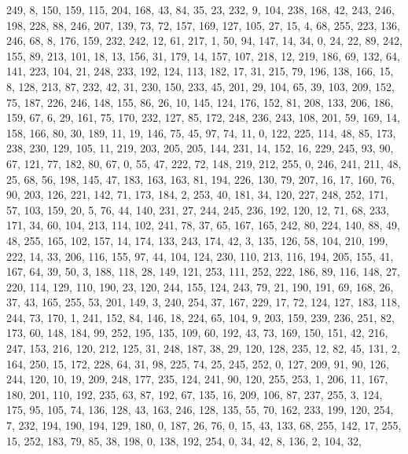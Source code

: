 \begin{DoxyCode}
       249, 8, 150, 159, 115, 204, 168, 43, 84, 35, 23, 232, 9, 104, 238, 168, 42, 243, 246, 198, 228, 88, 246, 207,
       139, 73, 72, 157, 169, 127, 105, 27, 15, 4, 68, 255, 223, 136, 246, 68, 8, 176, 159, 232, 242, 12, 61, 217,
       1, 50, 94, 147, 14, 34, 0, 24, 22, 89, 242, 155, 89, 213, 101, 18, 13, 156, 31, 179, 14, 157, 107, 218, 12,
       219, 186, 69, 132, 64, 141, 223, 104, 21, 248, 233, 192, 124, 113, 182, 17, 31, 215, 79, 196, 138, 166, 15,
       8, 128, 213, 87, 232, 42, 31, 230, 150, 233, 45, 201, 29, 104, 65, 39, 103, 209, 152, 75, 187, 226, 246, 148,
       155, 86, 26, 10, 145, 124, 176, 152, 81, 208, 133, 206, 186, 159, 67, 6, 29, 161, 75, 170, 232, 127, 85,
       172, 248, 236, 243, 108, 201, 59, 169, 14, 158, 166, 80, 30, 189, 11, 19, 146, 75, 45, 97, 74, 11, 0, 122,
       225, 114, 48, 85, 173, 238, 230, 129, 105, 11, 219, 203, 205, 205, 144, 231, 14, 152, 16, 229, 245, 93, 90, 67,
       121, 77, 182, 80, 67, 0, 55, 47, 222, 72, 148, 219, 212, 255, 0, 246, 241, 211, 48, 25, 68, 56, 198, 145,
       47, 183, 163, 163, 81, 194, 226, 130, 79, 207, 16, 17, 160, 76, 90, 203, 126, 221, 142, 71, 173, 184, 2, 253,
       40, 181, 34, 120, 227, 248, 252, 171, 57, 103, 159, 20, 5, 76, 44, 140, 231, 27, 244, 245, 236, 192, 120,
       12, 71, 68, 233, 171, 34, 60, 104, 213, 114, 102, 241, 78, 37, 65, 167, 165, 242, 80, 224, 140, 88, 49, 48,
       255, 165, 102, 157, 14, 174, 133, 243, 174, 42, 3, 135, 126, 58, 104, 210, 199, 222, 14, 33, 206, 116, 155,
       97, 44, 104, 124, 230, 110, 213, 116, 194, 205, 155, 41, 167, 64, 39, 50, 3, 188, 118, 28, 149, 121, 253,
       111, 252, 222, 186, 89, 116, 148, 27, 220, 114, 129, 110, 190, 23, 120, 244, 155, 124, 243, 79, 21, 190, 191,
       69, 168, 26, 37, 43, 165, 255, 53, 201, 149, 3, 240, 254, 37, 167, 229, 17, 72, 124, 127, 183, 118, 244, 73,
       170, 1, 241, 152, 84, 146, 18, 224, 65, 104, 9, 203, 159, 239, 236, 251, 82, 173, 60, 148, 184, 99, 252,
       195, 135, 109, 60, 192, 43, 73, 169, 150, 151, 42, 216, 247, 153, 216, 120, 212, 125, 31, 248, 187, 38, 29,
       120, 128, 235, 12, 82, 45, 131, 2, 164, 250, 15, 172, 228, 64, 31, 98, 225, 74, 25, 245, 252, 0, 127, 209, 91,
       90, 126, 244, 120, 10, 19, 209, 248, 177, 235, 124, 241, 90, 120, 255, 253, 1, 206, 11, 167, 180, 201, 110,
       192, 235, 63, 87, 192, 67, 135, 16, 209, 106, 87, 237, 255, 3, 124, 175, 95, 105, 74, 136, 128, 43, 163,
       246, 128, 135, 55, 70, 162, 233, 199, 120, 254, 7, 232, 194, 190, 194, 129, 180, 0, 187, 26, 76, 0, 15, 43,
       133, 68, 255, 142, 17, 255, 15, 252, 183, 79, 85, 38, 198, 0, 138, 192, 254, 0, 34, 42, 8, 136, 2, 104, 32,

\end{DoxyCode}
